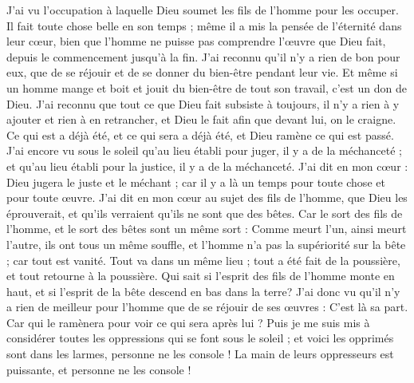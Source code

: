 \begin{multicols}{2}
J'ai vu l’occupation à laquelle Dieu soumet les fils de l’homme pour les occuper.
Il fait toute chose belle en son temps ; même il a mis la pensée de l’éternité dans leur cœur, bien que l'homme ne puisse pas comprendre l’œuvre que Dieu fait, depuis le commencement jusqu’à la fin.
J'ai reconnu qu'il n'y a rien de bon pour eux, que de se réjouir et de se donner du bien-être pendant leur vie.
Et même si un homme mange et boit et jouit du bien-être de tout son travail, c'est un don de Dieu.
J'ai reconnu que tout ce que Dieu fait subsiste à toujours, il n’y a rien à y ajouter et rien à en retrancher, et Dieu le fait afin que devant lui, on le craigne.
Ce qui est a déjà été, et ce qui sera a déjà été, et Dieu ramène ce qui est passé.
J'ai encore vu sous le soleil qu'au lieu établi pour juger, il y a de la méchanceté ; et qu'au lieu établi pour la justice, il y a de la méchanceté.
J'ai dit en mon cœur : Dieu jugera le juste et le méchant ; car il y a là un temps pour toute chose et pour toute œuvre.
J'ai dit en mon cœur au sujet des fils de l’homme, que Dieu les éprouverait, et qu'ils verraient qu'ils ne sont que des bêtes.
Car le sort des fils de l’homme, et le sort des bêtes sont un même sort : Comme meurt l'un, ainsi meurt l'autre, ils ont tous un même souffle, et l'homme n'a pas la supériorité sur la bête ; car tout est vanité.
Tout va dans un même lieu ; tout a été fait de la poussière, et tout retourne à la poussière.
Qui sait si l’esprit des fils de l’homme monte en haut, et si l’esprit de la bête descend en bas dans la terre?
J'ai donc vu qu'il n'y a rien de meilleur pour l'homme que de se réjouir de ses œuvres : C'est là sa part. Car qui le ramènera pour voir ce qui sera après lui ?
\VerseOne{}Puis je me suis mis à considérer toutes les oppressions qui se font sous le soleil ; et voici les opprimés sont dans les larmes, personne ne les console ! La main de leurs oppresseurs est puissante, et personne ne les console !

\end{multicols}
